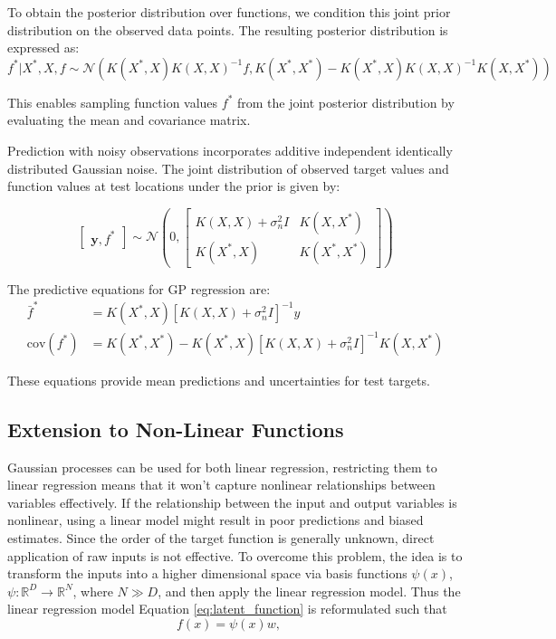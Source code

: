 To obtain the posterior distribution over functions, we condition this joint prior distribution on the observed data points. The resulting posterior distribution is expressed as:
\begin{equation}\label{noisefree_predictive_distrbution}
    f^* | X^*, X, f \sim \mathcal{N} \left( K(X^*,X)K(X,X)^{-1}f, K(X^*,X^*) - K(X^*,X)K(X,X)^{-1}K(X,X^*) \right)
\end{equation}

This enables sampling function values $f^*$ from the joint posterior distribution by evaluating the mean and covariance matrix.

Prediction with noisy observations incorporates additive independent identically distributed Gaussian noise. The joint distribution of observed target values and function values at test locations under the prior is given by:

\begin{equation}\label{eq:noisy_joint_distrubtion}
     \begin{bmatrix}\mathbf{y}, f^* \end{bmatrix} \sim \mathcal{N} \left(0, \begin{bmatrix} K(X,X) + \sigma^2_n I & K(X,X^*) \\ K(X^*,X) & K(X^*,X^*) \end{bmatrix} \right)
\end{equation}

The predictive equations for GP regression are:
\begin{align}\label{noisy_predictive_distrbution}
\bar{f}^* &= K(X^*,X)[K(X,X) + \sigma^2_n I]^{-1}y \\
\text{cov}(f^*) &= K(X^*,X^*) - K(X^*,X)[K(X,X) + \sigma^2_n I]^{-1}K(X,X^*)
\end{align}

These equations provide mean predictions and uncertainties for test targets.

\subsection{Extension to Non-Linear Functions}\label{sec:section2.2}
Gaussian processes can be used for both linear regression,  restricting them to linear regression means that it won't capture nonlinear relationships between variables effectively. If the relationship between the input and output variables is nonlinear, using a linear model might result in poor predictions and biased estimates. Since the order of the target function is generally unknown, direct application of raw inputs is not effective.  To overcome this problem, the idea is to transform the inputs into a higher dimensional space via basis functions $\psi(x)$, $\psi : \mathbb{R}^D \rightarrow \mathbb{R}^N$, where $N \gg D$, and then apply the linear regression model. Thus the linear regression model Equation \ref{eq:latent_function} is reformulated such that 
\begin{equation}\label{eq:non_linear_regression_model}
f(x) = \psi(x)w, \quad 
\end{equation}

